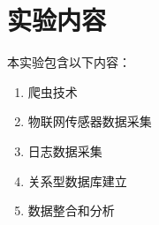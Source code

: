 \section{实验内容}
本实验包含以下内容：
\begin{enumerate}
    \item 爬虫技术
    \item 物联网传感器数据采集
    \item 日志数据采集
    \item 关系型数据库建立
    \item 数据整合和分析
\end{enumerate}